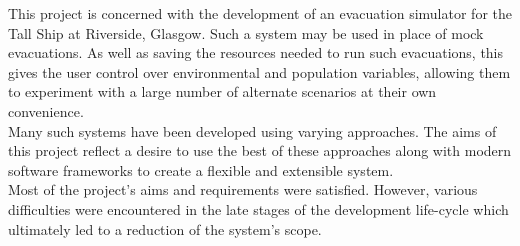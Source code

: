 This project is concerned with the development of an evacuation simulator for the Tall Ship at Riverside, Glasgow. Such a system may be used in place of mock evacuations. As well as saving the resources needed to run such evacuations, this gives the user control over environmental and population variables, allowing them to experiment with a large number of alternate scenarios at their own convenience.\\
Many such systems have been developed using varying approaches. The aims of this project reflect a desire to use the best of these approaches along with modern software frameworks to create a flexible and extensible system.\\
Most of the project's aims and requirements were satisfied. However, various difficulties were encountered in the late stages of the development life-cycle which ultimately led to a reduction of the system's scope.
